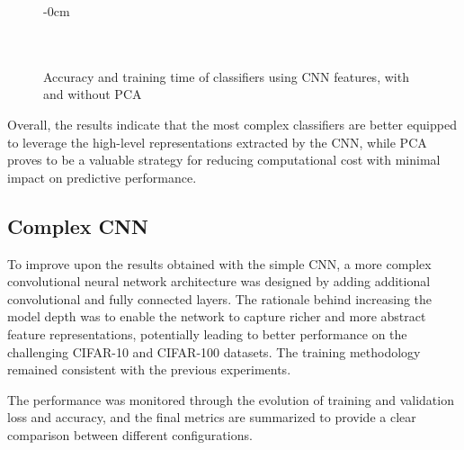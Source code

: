 \documentclass[journal,article,submit,pdftex,moreauthors]{Definitions/mdpi}
\begin{document}
\begin{figure}[H]
\begin{adjustwidth}{-\extralength}{0cm}
\centering
{}\\[0.5em]
\\[0.5em]
\\[0.5em]
\end{adjustwidth}
\caption{Accuracy and training time of classifiers using CNN features, with and without PCA}
\end{figure}

Overall, the results indicate that the most complex classifiers are better equipped to leverage the high-level representations extracted by the CNN, while PCA proves to be a valuable strategy for reducing computational cost with minimal impact on predictive performance.


\subsection{Complex CNN}

To improve upon the results obtained with the simple CNN, a more complex convolutional neural network architecture was designed by adding additional convolutional and fully connected layers. The rationale behind increasing the model depth was to enable the network to capture richer and more abstract feature representations, potentially leading to better performance on the challenging CIFAR-10 and CIFAR-100 datasets.  
The training methodology remained consistent with the previous experiments.

The performance was monitored through the evolution of training and validation loss and accuracy, and the final metrics are summarized to provide a clear comparison between different configurations.
\end{document}
